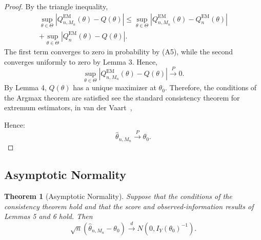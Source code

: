 \documentclass[a4paper,11pt]{amsart}
\newtheorem{theorem}{Theorem}
\theoremstyle{definition}
\theoremstyle{plain}
\theoremstyle{remark}
\newcommand{\1}{\mathbf{1}}
\begin{document}
\begin{proof}
By the triangle inequality,
\begin{align*}
\sup_{\theta\in\Theta}
\left|
Q_{n,M_n}^{\mathrm{EM}}(\theta)-Q(\theta)
\right|
\leq
\sup_{\theta\in\Theta}
\left|
Q_{n,M_n}^{\mathrm{EM}}(\theta)
-
Q_n^{\mathrm{EM}}(\theta)
\right|\\
+
\sup_{\theta\in\Theta}
\left|
Q_n^{\mathrm{EM}}(\theta)-Q(\theta)
\right|.
\end{align*}
The first term converges to zero in probability by (A5), while the second converges uniformly to zero by Lemma 3. Hence,
$$
\sup_{\theta\in\Theta}
\left|
Q_{n,M_n}^{\mathrm{EM}}(\theta)-Q(\theta)
\right|
\xrightarrow{P}0.
$$
By Lemma 4, $Q(\theta)$ has a unique maximizer at $\theta_0$. Therefore, the conditions of the Argmax theorem are satisfied see the standard consistency theorem for extremum estimators, in van der Vaart~\cite{VanDerVaart2000}, 

Hence:
$$
\widehat\theta_{n,M_n}
\xrightarrow{P}
\theta_0.
$$
\end{proof}

\subsection{Asymptotic Normality}

\begin{theorem}[Asymptotic Normality]
Suppose that the conditions of the consistency theorem hold and that the score and observed-information results of Lemmas 5 and 6 hold. Then
$$
\sqrt n
\left(
\widehat\theta_{n,M_n}-\theta_0
\right)
\xrightarrow{d}
N\left(
0,I_Y(\theta_0)^{-1}
\right).
$$
\end{theorem}
\end{document}

